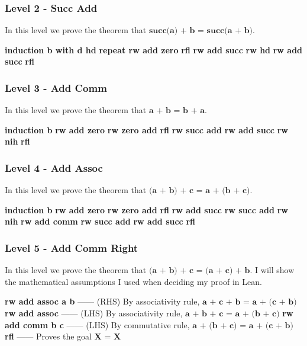 \documentclass{article}
\theoremstyle{theorem}
\theoremstyle{definition}
\theoremstyle{remark}
\begin{document}
  \subsubsection*{Level 2 - Succ Add}
  In this level we prove the theorem that $\textbf{succ(a) + b = succ(a + b)}$.

  \bgroup\obeylines
  \qquad \textbf{induction b with d hd}
  \qquad \textbf{repeat rw add zero}
  \qquad \textbf{rfl}
  \qquad \textbf{rw add succ}
  \qquad \textbf{rw hd}
  \qquad \textbf{rw add succ}
  \qquad \textbf{rfl}
  \egroup

  \subsubsection*{Level 3 - Add Comm}
  In this level we prove the theorem that $\textbf{a + b = b + a}$.

  \bgroup\obeylines
  \qquad \textbf{induction b}
  \qquad \textbf{rw add zero}
  \qquad \textbf{rw zero add}
  \qquad \textbf{rfl}
  \qquad \textbf{rw succ add}
  \qquad \textbf{rw add succ}
  \qquad \textbf{rw nih}
  \qquad \textbf{rfl}
  \egroup

  \subsubsection*{Level 4 - Add Assoc}
  In this level we prove the theorem that $\textbf{(a + b) + c = a + (b + c)}$.

  \bgroup\obeylines
  \qquad \textbf{induction b}
  \qquad \textbf{rw add zero}
  \qquad \textbf{rw zero add}
  \qquad \textbf{rfl}
  \qquad \textbf{rw add succ}
  \qquad \textbf{rw succ add}
  \qquad \textbf{rw nih}
  \qquad \textbf{rw add comm}
  \qquad \textbf{rw succ add}
  \qquad \textbf{rw add succ}
  \qquad \textbf{rfl}
  \egroup

  \subsubsection*{Level 5 - Add Comm Right}
  In this level we prove the theorem that $\textbf{(a + b) + c = (a + c) + b}$. I will show the mathematical assumptions I used when deciding my proof in Lean.

  \bgroup\obeylines
  \qquad \textbf{rw add assoc a b} —— (RHS) By associativity rule, $\textbf{a + c + b = a + (c + b)}$
  \qquad \textbf{rw add assoc} —— (LHS) By associativity rule, $\textbf{a + b + c = a + (b + c)}$
  \qquad \textbf{rw add comm b c} —— (LHS) By commutative rule, $\textbf{a + (b + c) = a + (c + b)}$
  \qquad \textbf{rfl} —— Proves the goal $\textbf{X = X}$
  \egroup
\end{document}
